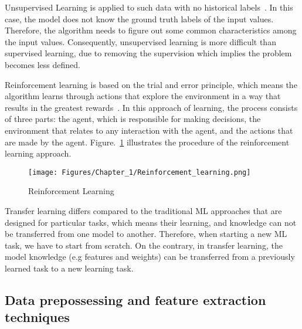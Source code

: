 Unsupervised Learning is applied to such data with no historical labels~\cite{Ongsulee2018}. 
In this case, the model does not know the ground truth labels of the input values. Therefore, the algorithm needs to figure out some common characteristics among the input values.
Consequently, unsupervised learning is more difficult than supervised learning, due to removing the supervision which implies the problem becomes less defined.

Reinforcement learning is based on the trial and error principle, which means the algorithm learns through actions that explore the environment in a way that results in the greatest rewards~\cite{Russell2010}.
In this approach of learning, the process consists of three parts: the agent, which is responsible for making decisions, the environment that relates to any interaction with the agent, and the actions that are made by the agent. Figure.~\ref{fig:ReinforcementLearning} illustrates the procedure of the reinforcement learning approach.
\begin{figure} [!ht]
	\begin{center}
		\centering
		\texttt{[image: Figures/Chapter\_1/Reinforcement\_learning.png]}
	\end{center}
	\caption{Reinforcement Learning} 
	\label{fig:ReinforcementLearning}
\end{figure}

Transfer learning differs compared to the traditional ML approaches that are designed for particular tasks, which means their learning, and knowledge can not be transferred from one model to another.
Therefore, when starting a new ML task, we have to start from scratch.
On the contrary, in transfer learning, the model knowledge (e.g features and weights) can be transferred from a previously learned task to a new learning task.
\subsection[Data prepossessing and FE]{Data prepossessing and feature extraction techniques}		

